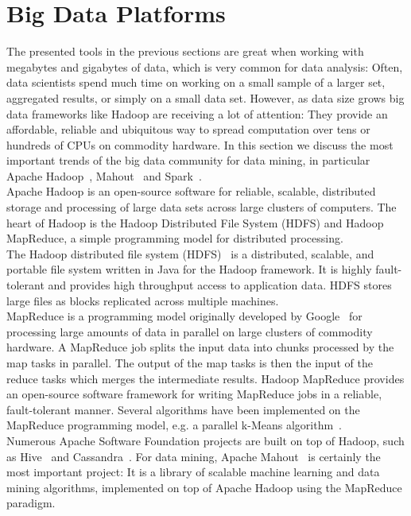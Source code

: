 \section{Big Data Platforms}
The presented tools in the previous sections are great when working with megabytes and gigabytes of data, which is very common for data analysis: Often, data scientists spend much time on working on a small sample of a larger set, aggregated results, or simply on a small data set. However, as data size grows big data frameworks like Hadoop are receiving a lot of attention: They provide an affordable, reliable and ubiquitous way to spread computation over tens or hundreds of CPUs on commodity hardware. In this section we discuss the most important trends of the big data community for data mining, in particular Apache Hadoop~\parencite{hadoop}, Mahout~\parencite{mahout} and Spark~\parencite{spark}.
\\
Apache Hadoop is an open-source software for reliable, scalable, distributed storage and processing of large data sets across large clusters of computers. The heart of Hadoop is the Hadoop Distributed File System (HDFS) and Hadoop MapReduce, a simple programming model for distributed processing. 
\\
The Hadoop distributed file system (HDFS)~\parencite{hdfs} is a distributed, scalable, and portable file system written in Java for the Hadoop framework. It is highly fault-tolerant and provides high throughput access to application data. HDFS stores large files as blocks replicated across multiple machines.
\\
MapReduce is a programming model originally developed by Google~\parencite{mapreduce} for processing large amounts of data in parallel on large clusters of commodity hardware. A MapReduce job splits the input data into chunks processed by the map tasks in parallel. The output of the map tasks is then the input of the reduce tasks which merges the intermediate results. Hadoop MapReduce provides an open-source software framework for writing MapReduce jobs in a reliable, fault-tolerant manner. 
Several algorithms have been implemented on the MapReduce programming model, e.g. a parallel k-Means algorithm~\parencite{parallelkmeans}. 
\\
Numerous Apache Software Foundation projects are built on top of Hadoop, such as Hive~\parencite{hive} and Cassandra~\parencite{cassandra}. For data mining, Apache Mahout~\parencite{mahout} is certainly the most important project: It is a library of scalable machine learning and data mining algorithms, implemented on top of Apache Hadoop using the MapReduce paradigm. 

